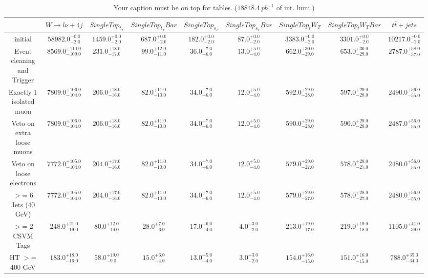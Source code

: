 \documentclass{article}
\begin{document}
\begin{table}
\caption{Your caption must be on top for tables. ($18848.4~pb^{-1}$ of int. lumi.)}
\label{tab:}
\centering
\begin{tabular}{|c|cccccccc|}
\toprule
&$W\rightarrow l\nu + 4j$	&$SingleTop_t_T$	&$SingleTop_t_TBar$	&$SingleTop_s_T$	&$SingleTop_s_TBar$	&$SingleTop_tW_T$	&$SingleTop_tW_TBar$	&$t\bar{t}+jets$	\\

\midrule
initial&	$58982.0^{+0.0}_{-2.0}$	&$1459.0^{+0.0}_{-2.0}$	&$687.0^{+0.0}_{-2.0}$	&$182.0^{+0.0}_{-2.0}$	&$87.0^{+0.0}_{-2.0}$	&$3383.0^{+0.0}_{-2.0}$	&$3301.0^{+0.0}_{-2.0}$	&$10217.0^{+0.0}_{-2.0}$	\\

Event cleaning and Trigger&	$8569.0^{+110.0}_{-109.0}$	&$231.0^{+18.0}_{-17.0}$	&$99.0^{+12.0}_{-11.0}$	&$36.0^{+7.0}_{-6.0}$	&$13.0^{+5.0}_{-4.0}$	&$662.0^{+30.0}_{-29.0}$	&$653.0^{+30.0}_{-29.0}$	&$2787.0^{+58.0}_{-57.0}$	\\

Exactly 1 isolated muon&	$7809.0^{+106.0}_{-104.0}$	&$206.0^{+18.0}_{-16.0}$	&$82.0^{+11.0}_{-10.0}$	&$34.0^{+7.0}_{-6.0}$	&$12.0^{+5.0}_{-4.0}$	&$592.0^{+29.0}_{-28.0}$	&$597.0^{+29.0}_{-28.0}$	&$2490.0^{+56.0}_{-55.0}$	\\

Veto on extra loose muons&	$7809.0^{+106.0}_{-104.0}$	&$206.0^{+18.0}_{-16.0}$	&$82.0^{+11.0}_{-10.0}$	&$34.0^{+7.0}_{-6.0}$	&$12.0^{+5.0}_{-4.0}$	&$590.0^{+29.0}_{-28.0}$	&$590.0^{+29.0}_{-28.0}$	&$2487.0^{+56.0}_{-55.0}$	\\

Veto on loose electrons&	$7772.0^{+105.0}_{-104.0}$	&$204.0^{+17.0}_{-16.0}$	&$82.0^{+11.0}_{-10.0}$	&$34.0^{+7.0}_{-6.0}$	&$12.0^{+5.0}_{-4.0}$	&$579.0^{+29.0}_{-27.0}$	&$578.0^{+28.0}_{-27.0}$	&$2480.0^{+56.0}_{-55.0}$	\\

$>$= 6 Jets (40 GeV)&	$7772.0^{+105.0}_{-104.0}$	&$204.0^{+17.0}_{-16.0}$	&$82.0^{+11.0}_{-10.0}$	&$34.0^{+7.0}_{-6.0}$	&$12.0^{+5.0}_{-4.0}$	&$579.0^{+29.0}_{-27.0}$	&$578.0^{+28.0}_{-27.0}$	&$2480.0^{+56.0}_{-55.0}$	\\

$>$= 2 CSVM Tags&	$248.0^{+21.0}_{-19.0}$	&$80.0^{+12.0}_{-10.0}$	&$28.0^{+7.0}_{-6.0}$	&$17.0^{+6.0}_{-4.0}$	&$4.0^{+3.0}_{-2.0}$	&$213.0^{+19.0}_{-17.0}$	&$219.0^{+19.0}_{-18.0}$	&$1105.0^{+41.0}_{-39.0}$	\\

HT $>$=  400 GeV&	$183.0^{+18.0}_{-16.0}$	&$58.0^{+10.0}_{-9.0}$	&$15.0^{+6.0}_{-4.0}$	&$13.0^{+5.0}_{-4.0}$	&$3.0^{+3.0}_{-2.0}$	&$154.0^{+16.0}_{-15.0}$	&$151.0^{+16.0}_{-15.0}$	&$788.0^{+35.0}_{-34.0}$	\\

\bottomrule
\end{tabular}
\end{table}
\end{document}
